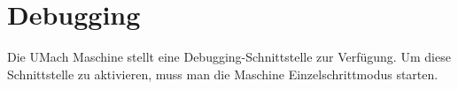 \chapter{Debugging}

Die UMach Maschine stellt eine Debugging-Schnittstelle zur Verfügung. Um diese
Schnittstelle zu aktivieren, muss man die Maschine Einzelschrittmodus starten.

